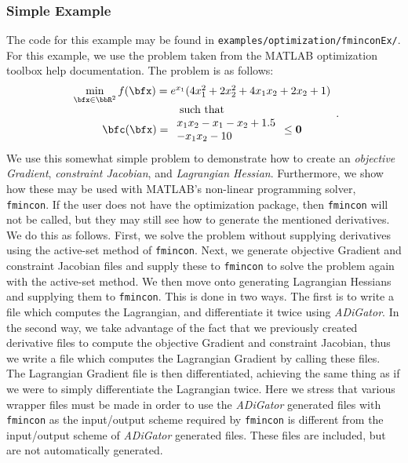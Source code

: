 \documentclass[10pt,pdftex]{article}
\begin{document}
\subsubsection{Simple Example}
The code for this example may be found in \texttt{examples/optimization/fminconEx/}.
For this example, we use the problem taken from the MATLAB optimization toolbox help documentation. The problem is as follows:
\begin{equation}
\begin{array}{c}
\min\limits_{\bfx \in \bbR^2}  f(\bfx) = e^{x_1}(4x_1^2+2x_2^2+4x_1x_2+2x_2+1)\\
\text{such that}\\
\bfc(\bfx) = 
\begin{array}{ll}
x_1x_2 - x_1-x_2+1.5 \\
-x_1x_2-10
\end{array} \leq \textbf{0}
\end{array}.
\end{equation}
We use this somewhat simple problem to demonstrate how to create an \emph{objective Gradient}, \emph{constraint Jacobian}, and \emph{Lagrangian Hessian}. Furthermore, we show how these may be used with MATLAB's non-linear programming solver, \texttt{fmincon}. If the user does not have the optimization package, then \texttt{fmincon} will not be called, but they may still see how to generate the mentioned derivatives. We do this as follows. First, we solve the problem without supplying derivatives using the active-set method of \texttt{fmincon}. Next, we generate objective Gradient and constraint Jacobian files and supply these to \texttt{fmincon} to solve the problem again with the active-set method. We then move onto generating Lagrangian Hessians and supplying them to \texttt{fmincon}. This is done in two ways. The first is to write a file which computes the Lagrangian, and differentiate it twice using \emph{ADiGator}. In the second way, we take advantage of the fact that we previously created derivative files to compute the objective Gradient and constraint Jacobian, thus we write a file which computes the Lagrangian Gradient by calling these files. The Lagrangian Gradient file is then differentiated, achieving the same thing as if we were to simply differentiate the Lagrangian twice.
Here we stress that various wrapper files must be made in order to use the \emph{ADiGator} generated files with \texttt{fmincon} as the input/output scheme required by \texttt{fmincon} is different from the input/output scheme of \emph{ADiGator} generated files. These files are included, but are not automatically generated.
\end{document}
